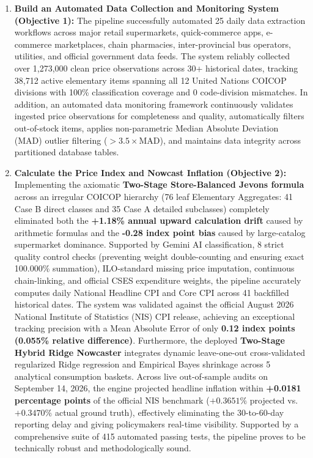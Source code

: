 \begin{enumerate}
    \item \textbf{Build an Automated Data Collection and Monitoring System (Objective 1):} The pipeline successfully automated 25 daily data extraction workflows across major retail supermarkets, quick-commerce apps, e-commerce marketplaces, chain pharmacies, inter-provincial bus operators, utilities, and official government data feeds. The system reliably collected over 1,273,000 clean price observations across 30+ historical dates, tracking 38,712 active elementary items spanning all 12 United Nations COICOP divisions with 100\% classification coverage and 0 code-division mismatches. In addition, an automated data monitoring framework continuously validates ingested price observations for completeness and quality, automatically filters out-of-stock items, applies non-parametric Median Absolute Deviation (MAD) outlier filtering ($>3.5\times\text{MAD}$), and maintains data integrity across partitioned database tables.
    \item \textbf{Calculate the Price Index and Nowcast Inflation (Objective 2):} Implementing the axiomatic \textbf{Two-Stage Store-Balanced Jevons formula} across an irregular COICOP hierarchy (76 leaf Elementary Aggregates: 41 Case B direct classes and 35 Case A detailed subclasses) completely eliminated both the \textbf{+1.18\% annual upward calculation drift} caused by arithmetic formulas and the \textbf{-0.28 index point bias} caused by large-catalog supermarket dominance. Supported by Gemini AI classification, 8 strict quality control checks (preventing weight double-counting and ensuring exact 100.000\% summation), ILO-standard missing price imputation, continuous chain-linking, and official CSES expenditure weights, the pipeline accurately computes daily National Headline CPI and Core CPI across 41 backfilled historical dates. The system was validated against the official August 2026 National Institute of Statistics (NIS) CPI release, achieving an exceptional tracking precision with a Mean Absolute Error of only \textbf{0.12 index points (0.055\% relative difference)}. Furthermore, the deployed \textbf{Two-Stage Hybrid Ridge Nowcaster} integrates dynamic leave-one-out cross-validated regularized Ridge regression and Empirical Bayes shrinkage across 5 analytical consumption baskets. Across live out-of-sample audits on September 14, 2026, the engine projected headline inflation within \textbf{+0.0181 percentage points} of the official NIS benchmark ($+0.3651\%$ projected vs. $+0.3470\%$ actual ground truth), effectively eliminating the 30-to-60-day reporting delay and giving policymakers real-time visibility. Supported by a comprehensive suite of 415 automated passing tests, the pipeline proves to be technically robust and methodologically sound.

\end{enumerate}
